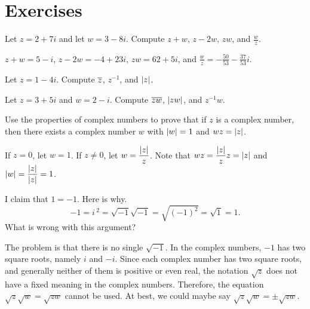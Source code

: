 \section*{Exercises}

\begin{ex}
  Let $z=2+7i$ and let $w=3-8i$. Compute $z + w$, $z - 2w$, $zw$, and $\frac{w}{z}$.
  \begin{sol}
    $z + w = 5-i$, $z - 2w = -4 + 23i$, $zw = 62+5i$, and
    $\displaystyle\frac{w}{z} = -\frac{50}{53}-\frac{37}{53}i$.
  \end{sol}
\end{ex}

\begin{ex}
  Let $z = 1 - 4i$. Compute $\overline{z}$, $z^{-1}$, and $\left|z\right|$.
\end{ex}

\begin{ex}
  Let $z = 3+5i$ and $w = 2-i$. Compute $\overline{zw}$, $\left|zw\right|$,
  and $z^{-1}w$.
\end{ex}

\begin{ex}
  Use the properties of complex numbers to prove that if $z$ is a
  complex number, then there exists a complex number $w$ with
  $\left|w\right|=1$ and $wz=\left|z\right|$.
  \begin{sol}
    If $z=0$, let $w=1$. If $z\neq 0$, let
    $w =\displaystyle\frac{\left|z\right|}{z}$. Note that
    $\displaystyle wz = \frac{\left|z\right|}{z}z = \left|z\right|$ and
    $\displaystyle \left|w\right| = \frac{\left|z\right|}{\left|z\right|} = 1$.
  \end{sol}
\end{ex}

\begin{ex}
  I claim that $1=-1$. Here is why.
  \begin{equation*}
    -1=i\,^{2}=\sqrt{-1}\sqrt{-1}=\sqrt{(-1) ^{2}}=\sqrt{1}=1.
  \end{equation*}
  What is wrong with this argument?
  \begin{sol}
    The problem is that there is no single $\sqrt{-1}$. In the complex
    numbers, $-1$ has two square roots, namely $i$ and $-i$. Since
    each complex number has two square roots, and generally neither of
    them is positive or even real, the notation $\sqrt{z}$ does not
    have a fixed meaning in the complex numbers. Therefore, the
    equation $\sqrt{z}\sqrt{w} = \sqrt{zw}$ cannot be used. At best,
    we could maybe say $\sqrt{z}\sqrt{w} = \pm\sqrt{zw}$.
  \end{sol}
\end{ex}

